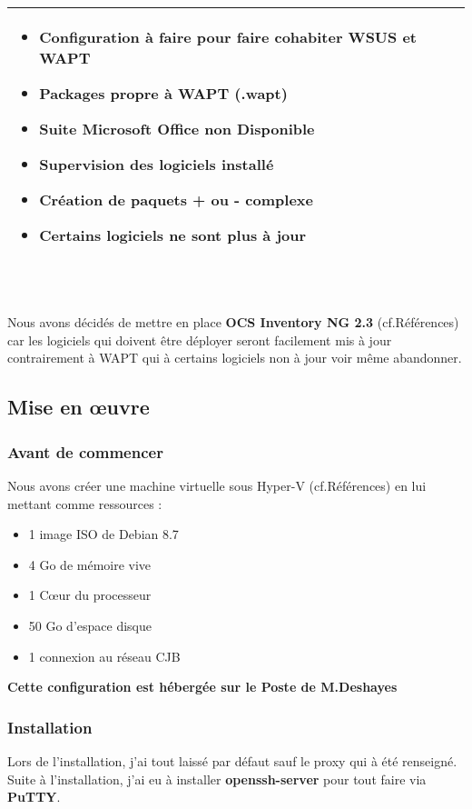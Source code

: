\documentclass[11pt,a4paper,oneside]{article}
\begin{document}
\begin{tabular}{|p{3.1cm}|p{6.5cm}|p{6.5cm}|}
\begin{itemize}
												\item Configuration à faire pour faire cohabiter WSUS et WAPT 
												\item Packages propre à WAPT (.wapt)
												\item Suite Microsoft Office non Disponible
												\item Supervision des logiciels installé
												\item Création de paquets + ou - complexe
												\item Certains logiciels ne sont plus à jour			
										\end{itemize} \\
	\hline	
\end{tabular}
\\ \\
Nous avons décidés de mettre en place \textbf{OCS Inventory NG 2.3} (cf.Références) car les logiciels qui doivent être déployer seront facilement mis à jour contrairement à WAPT qui à certains logiciels non à jour voir même abandonner.

\subsection{Mise en \oe{}uvre}
\subsubsection{Avant de commencer} 
Nous avons créer une machine virtuelle sous Hyper-V (cf.Références) en lui mettant comme ressources :\\ \begin{itemize}
				\item 1 image ISO de Debian 8.7
				\item 4 Go de mémoire vive
				\item 1 C{\oe}ur du processeur
				\item 50 Go d'espace disque
				\item 1 connexion au réseau CJB	
\end{itemize} 

\begin{center}
\textbf{Cette configuration est hébergée sur le Poste de M.Deshayes}
\end{center}
\newpage
\subsubsection{Installation}
Lors de l'installation, j'ai tout laissé par défaut sauf le proxy qui à été renseigné. Suite à l'installation, j'ai eu à installer \textbf{openssh-server} pour tout faire via \textbf{PuTTY}.\\
\end{document}
